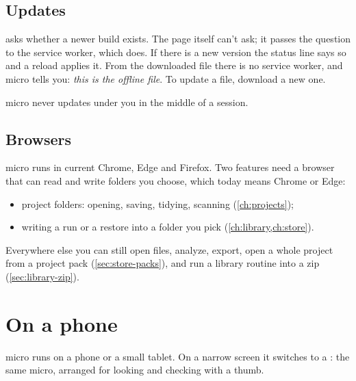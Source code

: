 \subsection{Updates}\label{sec:sealed-updates}
 asks whether a newer build exists. The page itself can't ask; it passes the question to the service worker, which does. If there is a new version the status line says so and a reload applies it. From the downloaded file there is no service worker, and micro tells you: \emph{this is the offline file}. To update a file, download a new one.

micro never updates under you in the middle of a session.

\subsection{Browsers}
micro runs in current Chrome, Edge and Firefox. Two features need a browser that can read and write folders you choose, which today means Chrome or Edge:

\begin{itemize}
\item project folders: opening, saving, tidying, scanning (\cref{ch:projects});
\item writing a run or a restore into a folder you pick (\cref{ch:library,ch:store}).
\end{itemize}

Everywhere else you can still open files, analyze, export, open a whole project from a project pack (\cref{sec:store-packs}), and run a library routine into a zip (\cref{sec:library-zip}).

\section{On a phone}\label{sec:sealed-phone}
micro runs on a phone or a small tablet. On a narrow screen it switches to a : the same micro, arranged for looking and checking with a thumb.


